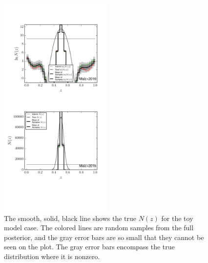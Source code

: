 \documentclass[preprint]{aastex}
\begin{document}
\begin{figure}
\includegraphics[width=0.5\textwidth]{figs/delt/samps.pdf}
\caption{The smooth, solid, black line shows the true $N(z)$ for the toy model 
case.  The colored lines are random samples from the full posterior, and the 
gray error bars are so small that they cannot be seen on the plot.  The gray 
error bars encompass the true distribution where it is nonzero.}
\label{fig:toy-samp}
\end{figure}
\end{document}
